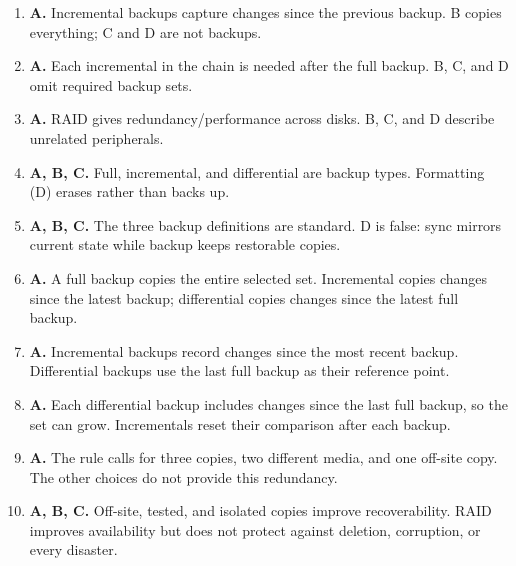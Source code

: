 \begin{enumerate}[label=\textbf{Q\arabic*.}, leftmargin=*]
\item \textbf{A.} Incremental backups capture changes since the previous backup. B copies everything; C and D are not backups.
\item \textbf{A.} Each incremental in the chain is needed after the full backup. B, C, and D omit required backup sets.
\item \textbf{A.} RAID gives redundancy/performance across disks. B, C, and D describe unrelated peripherals.
\item \textbf{A, B, C.} Full, incremental, and differential are backup types. Formatting (D) erases rather than backs up.
\item \textbf{A, B, C.} The three backup definitions are standard. D is false: sync mirrors current state while backup keeps restorable copies.
\item \textbf{A.} A full backup copies the entire selected set. Incremental copies changes since the latest backup; differential copies changes since the latest full backup.

\item \textbf{A.} Incremental backups record changes since the most recent backup. Differential backups use the last full backup as their reference point.

\item \textbf{A.} Each differential backup includes changes since the last full backup, so the set can grow. Incrementals reset their comparison after each backup.

\item \textbf{A.} The rule calls for three copies, two different media, and one off-site copy. The other choices do not provide this redundancy.

\item \textbf{A, B, C.} Off-site, tested, and isolated copies improve recoverability. RAID improves availability but does not protect against deletion, corruption, or every disaster.

\end{enumerate}

